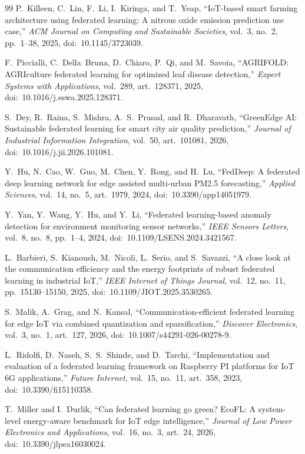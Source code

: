 \documentclass[a4paper,fleqn]{cas-dc}
\begin{document}
\begin{thebibliography}{99}
P.~Killeen, C.~Lin, F.~Li, I.~Kiringa, and T.~Yeap,
``IoT-based smart farming architecture using federated learning: A nitrous oxide emission prediction use case,''
\emph{ACM Journal on Computing and Sustainable Societies}, vol.~3, no.~2, pp.~1--38, 2025, doi:~10.1145/3723039.

F.~Piccialli, C.~Della~Bruna, D.~Chiaro, P.~Qi, and M.~Savoia,
``AGRIFOLD: AGRIculture federated learning for optimized leaf disease detection,''
\emph{Expert Systems with Applications}, vol.~289, art.~128371, 2025, doi:~10.1016/j.eswa.2025.128371.

S.~Dey, R.~Raina, S.~Mishra, A.~S.~Prasad, and R.~Dharavath,
``GreenEdge AI: Sustainable federated learning for smart city air quality prediction,''
\emph{Journal of Industrial Information Integration}, vol.~50, art.~101081, 2026, doi:~10.1016/j.jii.2026.101081.

Y.~Hu, N.~Cao, W.~Guo, M.~Chen, Y.~Rong, and H.~Lu,
``FedDeep: A federated deep learning network for edge assisted multi-urban PM2.5 forecasting,''
\emph{Applied Sciences}, vol.~14, no.~5, art.~1979, 2024, doi:~10.3390/app14051979.

Y.~Yan, Y.~Wang, Y.~Hu, and Y.~Li,
``Federated learning-based anomaly detection for environment monitoring sensor networks,''
\emph{IEEE Sensors Letters}, vol.~8, no.~8, pp.~1--4, 2024, doi:~10.1109/LSENS.2024.3421567.

L.~Barbieri, S.~Kianoush, M.~Nicoli, L.~Serio, and S.~Savazzi,
``A close look at the communication efficiency and the energy footprints of robust federated learning in industrial IoT,''
\emph{IEEE Internet of Things Journal}, vol.~12, no.~11, pp.~15130--15150, 2025, doi:~10.1109/JIOT.2025.3530265.

S.~Malik, A.~Grag, and N.~Kansal,
``Communication-efficient federated learning for edge IoT via combined quantization and sparsification,''
\emph{Discover Electronics}, vol.~3, no.~1, art.~127, 2026, doi:~10.1007/s44291-026-00278-9.

L.~Ridolfi, D.~Naseh, S.~S.~Shinde, and D.~Tarchi,
``Implementation and evaluation of a federated learning framework on Raspberry PI platforms for IoT 6G applications,''
\emph{Future Internet}, vol.~15, no.~11, art.~358, 2023, doi:~10.3390/fi15110358.

T.~Miller and I.~Durlik,
``Can federated learning go green? EcoFL: A system-level energy-aware benchmark for IoT edge intelligence,''
\emph{Journal of Low Power Electronics and Applications}, vol.~16, no.~3, art.~24, 2026, doi:~10.3390/jlpea16030024.


\end{thebibliography}
\end{document}
